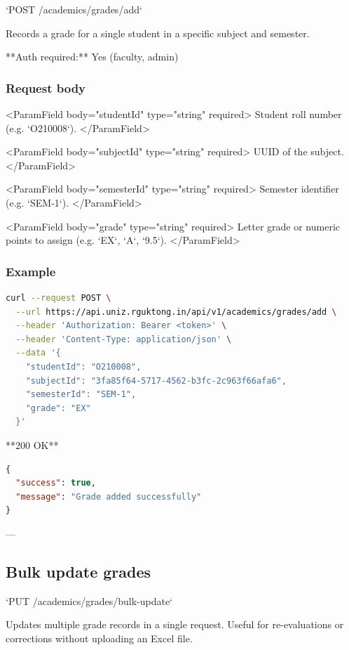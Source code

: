 `POST /academics/grades/add`

Records a grade for a single student in a specific subject and semester.

**Auth required:** Yes (faculty, admin)

\subsubsection{Request body}

<ParamField body="studentId" type="string" required>
  Student roll number (e.g. `O210008`).
</ParamField>

<ParamField body="subjectId" type="string" required>
  UUID of the subject.
</ParamField>

<ParamField body="semesterId" type="string" required>
  Semester identifier (e.g. `SEM-1`).
</ParamField>

<ParamField body="grade" type="string" required>
  Letter grade or numeric points to assign (e.g. `EX`, `A`, `9.5`).
</ParamField>

\subsubsection{Example}

\begin{lstlisting}[language=bash]
curl --request POST \
  --url https://api.uniz.rguktong.in/api/v1/academics/grades/add \
  --header 'Authorization: Bearer <token>' \
  --header 'Content-Type: application/json' \
  --data '{
    "studentId": "O210008",
    "subjectId": "3fa85f64-5717-4562-b3fc-2c963f66afa6",
    "semesterId": "SEM-1",
    "grade": "EX"
  }'

\end{lstlisting}

**200 OK**

\begin{lstlisting}[language=json]
{
  "success": true,
  "message": "Grade added successfully"
}

\end{lstlisting}

---

\subsection{Bulk update grades}

`PUT /academics/grades/bulk-update`

Updates multiple grade records in a single request. Useful for re-evaluations or corrections without uploading an Excel file.

